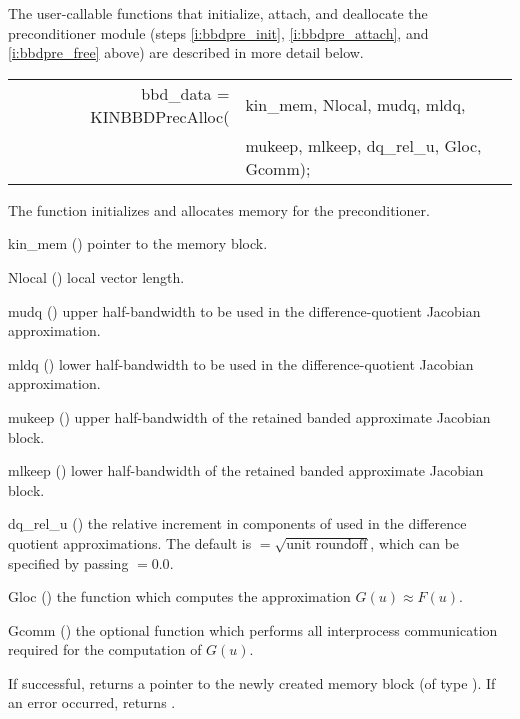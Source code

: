 The user-callable functions that initialize, attach, and deallocate
the {\kinbbdpre} preconditioner module (steps \ref{i:bbdpre_init},
\ref{i:bbdpre_attach}, and \ref{i:bbdpre_free} above) are described
in more detail below.
{
   \begin{tabular}[t]{@{}r@{}l@{}}
     bbd\_data = KINBBDPrecAlloc(&kin\_mem, Nlocal, mudq, mldq, \\
                                 &mukeep, mlkeep, dq\_rel\_u, Gloc, Gcomm);
   \end{tabular}
}
{
  The function  initializes and allocates
  memory for the {\kinbbdpre} preconditioner.
}
{
  \begin{args}[dq\_rel\_u]
  \item[kin\_mem] ()
    pointer to the {\kinsol} memory block.
  \item[Nlocal] ()
    local vector length.
  \item[mudq] ()
    upper half-bandwidth to be used in the difference-quotient Jacobian approximation.
  \item[mldq] ()
    lower half-bandwidth to be used in the difference-quotient Jacobian approximation.
  \item[mukeep] ()
    upper half-bandwidth of the retained banded approximate Jacobian block.
  \item[mlkeep] ()
    lower half-bandwidth of the retained banded approximate Jacobian block.
  \item[dq\_rel\_u] ()
    the relative increment in components of  used in the difference quotient
    approximations.  The default is $ = \sqrt{\text{unit roundoff}}$,
    which can be specified by passing $ = 0.0$.
  \item[Gloc] ()
    the {\C} function which computes the approximation $G(u) \approx F(u)$. 
  \item[Gcomm] ()
    the optional {\C} function which performs all interprocess communication required for
    the computation of $G(u)$.
  \end{args}
}
{
  If successful,  returns a pointer to the newly created 
  {\kinbbdpre} memory block (of type ).
  If an error occurred,  returns .
}
